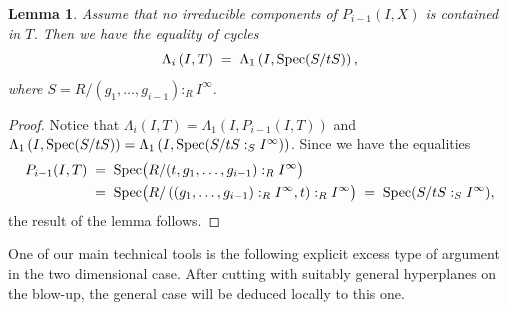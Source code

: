 \documentclass[a4paper, 11pt]{amsart}
\newcommand{\Spec}{\normalfont\text{Spec}}
\newtheorem{lemma}[lemma]{Lemma}
\theoremstyle{definition}
\begin{document}
	\begin{lemma}
		\label{lem_specialization_Seg}
		Assume that no irreducible components of $P_{i-1}(I, X)$ is contained in $T$. 
		Then we have the equality of cycles
		$$
		\Lambda_i\left(I, T\right) \;=\; \Lambda_1\left(I, \Spec(S/tS)\right),
		$$
		where $S=R/(g_1,\ldots,g_{i-1}):_RI^\infty$.
	\end{lemma}
	\begin{proof}
		Notice that $\Lambda_i(I, T) = \Lambda_1(I, P_{i-1}(I, T))$ and $\Lambda_1\left(I, \Spec(S/tS)\right) = \Lambda_1\left(I, \Spec(S/tS:_SI^\infty)\right) $.
		Since we have the equalities
		\begin{align*}
			P_{i-1}(I, T)  &\;=\; \Spec\big(R/(t, g_1,\ldots,g_{i-1}):_RI^\infty\big) \\
			& \;=\; \Spec\big(R/\left(( g_1,\ldots,g_{i-1}):_RI^\infty, t\right) :_R I^\infty\big) \;=\; \Spec(S/tS:_SI^\infty),
		\end{align*}
		the result of the lemma follows. 
	\end{proof}
	
	
	One of our main technical tools is the following explicit excess type of argument in the two dimensional case. 
	After cutting with suitably general hyperplanes on the blow-up, the general case will be deduced locally to this one. 
	
\end{document}
